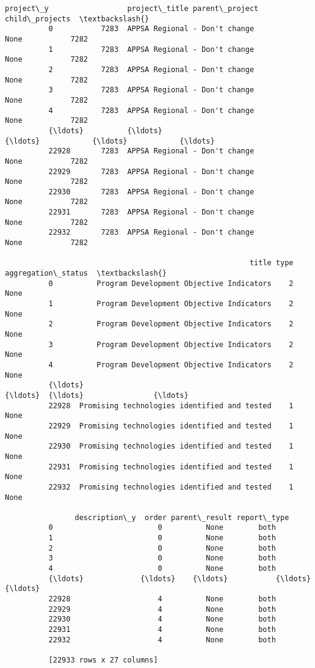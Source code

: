 \documentclass[11pt]{article}
\begin{document}
\begin{Verbatim}[commandchars=\\\{\}]
                 project\_y                  project\_title parent\_project child\_projects  \textbackslash{}
          0           7283  APPSA Regional - Don't change           None           7282   
          1           7283  APPSA Regional - Don't change           None           7282   
          2           7283  APPSA Regional - Don't change           None           7282   
          3           7283  APPSA Regional - Don't change           None           7282   
          4           7283  APPSA Regional - Don't change           None           7282   
          {\ldots}          {\ldots}                            {\ldots}            {\ldots}            {\ldots}   
          22928       7283  APPSA Regional - Don't change           None           7282   
          22929       7283  APPSA Regional - Don't change           None           7282   
          22930       7283  APPSA Regional - Don't change           None           7282   
          22931       7283  APPSA Regional - Don't change           None           7282   
          22932       7283  APPSA Regional - Don't change           None           7282   
          
                                                        title type aggregation\_status  \textbackslash{}
          0          Program Development Objective Indicators    2               None   
          1          Program Development Objective Indicators    2               None   
          2          Program Development Objective Indicators    2               None   
          3          Program Development Objective Indicators    2               None   
          4          Program Development Objective Indicators    2               None   
          {\ldots}                                             {\ldots}  {\ldots}                {\ldots}   
          22928  Promising technologies identified and tested    1               None   
          22929  Promising technologies identified and tested    1               None   
          22930  Promising technologies identified and tested    1               None   
          22931  Promising technologies identified and tested    1               None   
          22932  Promising technologies identified and tested    1               None   
          
                description\_y  order parent\_result report\_type  
          0                        0          None        both  
          1                        0          None        both  
          2                        0          None        both  
          3                        0          None        both  
          4                        0          None        both  
          {\ldots}             {\ldots}    {\ldots}           {\ldots}         {\ldots}  
          22928                    4          None        both  
          22929                    4          None        both  
          22930                    4          None        both  
          22931                    4          None        both  
          22932                    4          None        both  
          
          [22933 rows x 27 columns]
\end{Verbatim}
            
\end{document}
